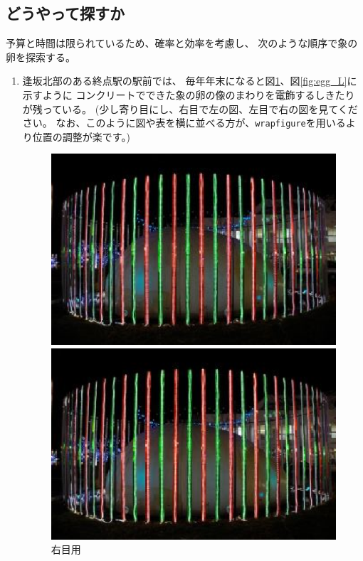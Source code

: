 \documentclass[11pt,a4j,dvipdfmx]{jarticle} 					%
\newcommand{\研究課題名}{象の卵}
\newcommand{\研究機関名}{逢坂大学}
\newcommand{\研究代表者氏名}{湯川秀樹}
\begin{document}
\subsection{どうやって探すか}
予算と時間は限られているため、確率と効率を考慮し、
次のような順序で象の卵を探索する。
\begin{enumerate}
	\item 逢坂北部のある終点駅の駅前では、
            	毎年年末になると図\ref{fig:egg_R}、図\ref{fig:egg_L}に示すように
            	コンクリートでできた象の卵の像のまわりを電飾するしきたりが残っている。
            	(少し寄り目にし、右目で左の図、左目で右の図を見てください。
            	なお、このように図や表を横に並べる方が、{\tt wrapfigure}を用いるより位置の調整が楽です。)
                \begin{figure}[h]
                 	\begin{minipage}[t]{0.49\linewidth}
            			\includegraphics[width=\linewidth]{figs/egg_R.eps}
            			\caption{右目用}
            			\label{fig:egg_R}
                		\end{minipage}
                		\hspace{0.01\linewidth}
                		\begin{minipage}[t]{0.49\linewidth}
            			\includegraphics[width=\linewidth]{figs/egg_L.eps}

\end{minipage}
\end{figure}
\end{enumerate}
\end{document}
